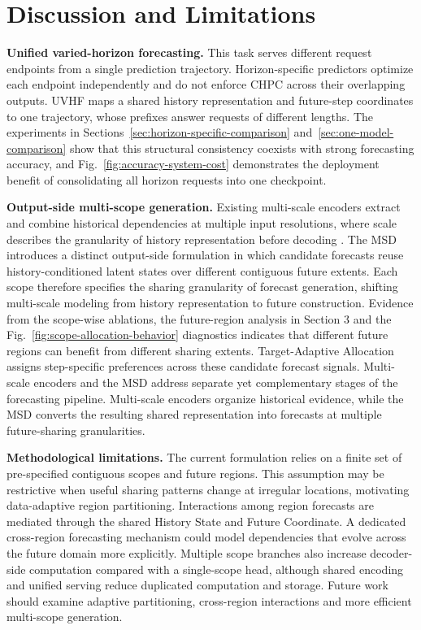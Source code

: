 \documentclass[final,3p,times]{elsarticle}
\newif\ifshowrevisions
\newcommand{\rev}[1]{\ifshowrevisions\textcolor{revisionblue}{#1}\else#1\fi}
\begin{document}
\section{Discussion and Limitations}
\label{sec:discussion}


\textbf{Unified varied-horizon forecasting.} \rev{This task serves different request endpoints from a single prediction trajectory.} Horizon-specific predictors optimize each endpoint independently and do not enforce CHPC across their overlapping outputs. \rev{UVHF maps a shared history representation and future-step coordinates to one trajectory, whose prefixes answer requests of different lengths.} The experiments in Sections~\ref{sec:horizon-specific-comparison} and~\ref{sec:one-model-comparison} show that this structural consistency coexists with strong forecasting accuracy, and Fig.~\ref{fig:accuracy-system-cost} demonstrates the deployment benefit of consolidating all horizon requests into one checkpoint.

\textbf{Output-side multi-scope generation.} Existing multi-scale encoders extract and combine historical dependencies at multiple input resolutions, where scale describes the granularity of history representation before decoding \citep{challu2023nhits,chen2024pathformer,wang2024timemixer}. \rev{The MSD introduces a distinct output-side formulation in which candidate forecasts reuse history-conditioned latent states over different contiguous future extents.} Each scope therefore specifies the sharing granularity of forecast generation, shifting multi-scale modeling from history representation to future construction. Evidence from the scope-wise ablations, the future-region analysis in Section 3 and the Fig.~\ref{fig:scope-allocation-behavior} diagnostics indicates that different future regions can benefit from different sharing extents. Target-Adaptive Allocation assigns step-specific preferences across these candidate forecast signals. \rev{Multi-scale encoders and the MSD address separate yet complementary stages of the forecasting pipeline. Multi-scale encoders organize historical evidence, while the MSD converts the resulting shared representation into forecasts at multiple future-sharing granularities.}

\textbf{Methodological limitations.} The current formulation relies on a finite set of pre-specified contiguous scopes and future regions. This assumption may be restrictive when useful sharing patterns change at irregular locations, motivating data-adaptive region partitioning. Interactions among region forecasts are mediated through the shared History State and Future Coordinate. A dedicated cross-region forecasting mechanism could model dependencies that evolve across the future domain more explicitly. Multiple scope branches also increase decoder-side computation compared with a single-scope head, although shared encoding and unified serving reduce duplicated computation and storage. Future work should examine adaptive partitioning, cross-region interactions and more efficient multi-scope generation.
\end{document}
